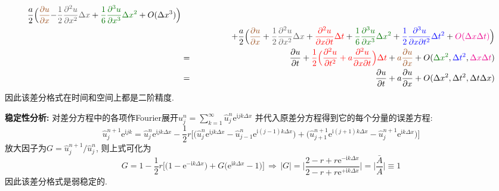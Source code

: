 \begin{solution}
{\begin{eqnarray*}
 \frac{a}{2}\Big(\textcolor[rgb]{0.6,0.3,0.1}{\frac{\partial u}{\partial x}}\textcolor[rgb]{0.33,0.33,0.33}{-\frac{1}{2}\frac{\partial^{2}u}{\partial x^{2}}\Delta x}+\textcolor{DarkGreen}{\frac{1}{6}\frac{\partial^{3}u}{\partial x^{3}}\Delta x^{2}}+O(\Delta x^{3})\Big)\\
 &  & \qquad\qquad+\frac{a}{2}\Big(\textcolor[rgb]{0.6,0.3,0.1}{\frac{\partial u}{\partial x}}+\textcolor[rgb]{0.33,0.33,0.33}{\frac{1}{2}\frac{\partial^{2}u}{\partial x^{2}}\Delta x}+\textcolor{red}{\frac{\partial^{2}u}{\partial x\partial t}\Delta t}+\textcolor{DarkGreen}{\frac{1}{6}\frac{\partial^{3}u}{\partial x^{3}}\Delta x^{2}}+\textcolor{blue}{\frac{1}{2}\frac{\partial^{3}u}{\partial x\partial t^{2}}\Delta t^{2}}+\textcolor{magenta}{O(\Delta x\Delta t)}\Big)\\
 & = & \frac{\partial u}{\partial t}+\textcolor{red}{\frac{1}{2}\Big(\frac{\partial^{2}u}{\partial t^{2}}+a\frac{\partial^{2}u}{\partial x\partial t}\Big)\Delta t}+\textcolor[rgb]{0.6,0.3,0.1}{a\frac{\partial u}{\partial x}}+O(\textcolor{DarkGreen}{\Delta x^{2}}, \textcolor{blue}{\Delta t^2}, \textcolor{magenta}{\Delta x\Delta t})\\
 & = & \frac{\partial u}{\partial t}+a\frac{\partial u}{\partial x}+O(\Delta x^{2},\Delta t^2, \Delta t\Delta x)
\end{eqnarray*}}
因此该差分格式在时间和空间上都是二阶精度.

\vspace{1em}
\noindent\textbf{稳定性分析:} 对差分方程中的各项作Fourier展开$
u_{j}^{n}=\sum_{k=1}^{\infty}\hat{u}_{j}^{n}\mathrm{e}^{\mathrm{i}jk\Delta x}%
$
并代入原差分方程得到它的每个分量的误差方程:
\[
\hat{u}_{j}^{n+1}\mathrm{e}^{\mathrm{i}jk}=\hat{u}_{j}^{n}\mathrm{e}^{\mathrm{i}jk\Delta x}-\frac{1}{2}r\Big[\Big(\hat{u}_{j}^{n}\mathrm{e}^{\mathrm{i}jk\Delta x}-\hat{u}_{j-1}^{n}\mathrm{e}^{\mathrm{i}(j-1)k\Delta x}\Big)+\Big(\hat{u}_{j+1}^{n+1}\mathrm{e}^{\mathrm{i}(j+1)k\Delta x}-\hat{u}_{j}^{n+1}\mathrm{e}^{\mathrm{i}k\Delta x}\Big)\Big]
\]
放大因子为$G=\hat{u}_{j}^{n+1}/\hat{u}_{j}^{n}$, 则上式可化为
\[
G=1-\frac{1}{2}r\Big[\big(1-\mathrm{e}^{-\mathrm{i}k\Delta x}\big)+G\big(\mathrm{e}^{\mathrm{i}k\Delta x}-1\big)\Big]\,\Longrightarrow\,|G|=\bigg|\frac{2-r+r\mathrm{e}^{-\mathrm{i}k\Delta x}}{2-r+r\mathrm{e}^{+\mathrm{i}k\Delta x}}\bigg|=\Big|\frac{\bar{A}}{A}\Big|\equiv1
\]
因此该差分格式是弱稳定的.
\end{solution} 
